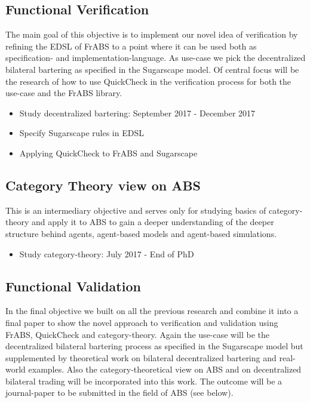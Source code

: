 \subsection{Functional Verification}
The main goal of this objective is to implement our novel idea of verification by refining the EDSL of FrABS to a point where it can be used both as specification- and implementation-language. As use-case we pick the decentralized bilateral bartering as specified in the Sugarscape model. Of central focus will be the research of how to use QuickCheck in the verification process for both the use-case and the FrABS library.

\begin{itemize}
\item Study decentralized bartering: September 2017 - December 2017
\item Specify Sugarscape rules in EDSL
\item Applying QuickCheck to FrABS and Sugarscape
\end{itemize}

\subsection{Category Theory view on ABS}
This is an intermediary objective and serves only for studying basics of category-theory and apply it to ABS to gain a deeper understanding of the deeper structure behind agents, agent-based models and agent-based simulations.

\begin{itemize}
\item Study category-theory: July 2017 - End of PhD
\end{itemize}

\subsection{Functional Validation}
In the final objective we built on all the previous research and combine it into a final paper to show the novel approach to verification and validation using FrABS, QuickCheck and category-theory. Again the use-case will be the decentralized bilateral bartering process as specified in the Sugarscape model but supplemented by theoretical work on bilateral decentralized bartering and real-world examples. Also the category-theoretical view on ABS and on decentralized bilateral trading will be incorporated into this work. The outcome will be a journal-paper to be submitted in the field of ABS (see below).

